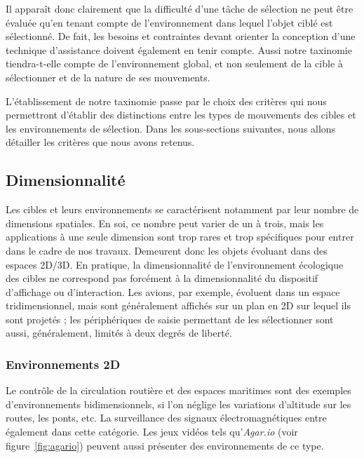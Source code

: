 	Il apparaît donc clairement que la difficulté d'une tâche de sélection ne peut être évaluée qu'en tenant compte de l'environnement dans lequel l'objet ciblé est sélectionné. De fait, les besoins et contraintes devant orienter la conception d'une technique d'assistance doivent également en tenir compte. Aussi notre taxinomie tiendra-t-elle compte de l'environnement global, et non seulement de la cible à sélectionner et de la nature de ses mouvements.


	L'établissement de notre taxinomie passe par le choix des critères qui nous permettront d'établir des distinctions entre les types de mouvements des cibles et les environnements de sélection. Dans les sous-sections suivantes, nous allons détailler les critères que nous avons retenus.
	
	\FloatBarrier \subsection{Dimensionnalité}
	Les cibles et leurs environnements se caractérisent notamment par leur nombre de dimensions spatiales. En soi, ce nombre peut varier de un à trois, mais les applications à une seule dimension sont trop rares et trop spécifiques pour entrer dans le cadre de nos travaux. Demeurent donc les objets évoluant dans des espaces 2D/3D. En pratique, la dimensionnalité de l'environnement \og écologique \fg{} des cibles ne correspond pas forcément à la dimensionnalité du dispositif d'affichage ou d'interaction. Les avions, par exemple, évoluent dans un espace tridimensionnel, mais sont généralement affichés sur un plan en 2D sur lequel ils sont projetés ; les périphériques de saisie permettant de les sélectionner sont aussi, généralement, limités à deux degrés de liberté.
	
	\FloatBarrier \subsubsection{Environnements 2D}
	Le contrôle de la circulation routière et des espaces maritimes sont des exemples d'environnements bidimensionnels, si l'on néglige les variations d'altitude sur les routes, les ponts, etc. La surveillance des signaux électromagnétiques entre également dans cette catégorie. Les jeux vidéos tels qu'\emph{Agar.io} (voir figure~\ref{fig:agario}) peuvent aussi présenter des environnements de ce type.
	
